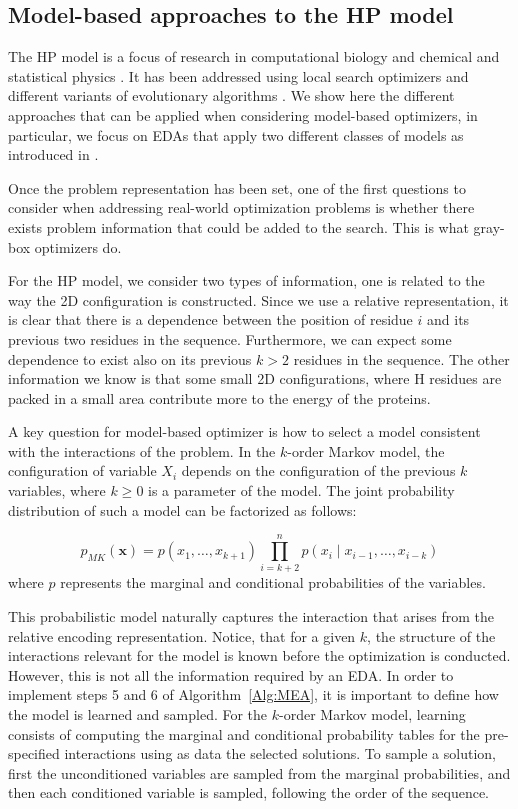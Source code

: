  \subsection{Model-based approaches to the HP model}

  The HP model is a focus of research in computational biology  \cite{Gupta_et_al:2005} and  chemical and statistical physics \cite{Kou_et_al:2006,Abe_and_Wako:2006}. It has been addressed using local search optimizers  \cite{Hsu_et_al:2003a} and different variants of evolutionary algorithms  \cite{Unger_and_Moult:1993}. We show here the different approaches that can be applied when considering model-based optimizers, in particular, we focus on EDAs that apply two different classes of models as introduced in \cite{Santana_et_al:2008a}. 

 Once the problem representation has been set, one of the first questions to consider when addressing real-world optimization problems is whether there exists problem information that could be added to the search. This is what gray-box optimizers do.

 For the HP model, we consider two types of information, one is related to the way the 2D configuration is constructed. Since we use a relative representation, it is clear that there is a dependence between the position of residue $i$ and its previous two residues in the sequence. Furthermore, we can expect some  dependence to exist also on its previous $k>2$ residues in the sequence. The other information we know is that some small 2D configurations, where H residues are packed in a small area  contribute more to the energy of the proteins.

 A key question for model-based optimizer is  how to select a model consistent with the interactions of the problem. In the $k$-order Markov model,  the configuration of variable $X_i$ depends on the configuration of the previous $k$ variables, where $k \geq 0$ is a parameter  of the model.  The joint probability distribution of such a model can be factorized as follows:

\begin{equation}
 p_{MK}(\textbf{x}) =  p(x_{1}, \ldots, x_{k+1})  \prod_{i=k+2}^{n}  p( x_{i} \mid  {x_{i-1}, \ldots, x_{i-k}})
\end{equation}
where $p$ represents the marginal and conditional probabilities of the variables. 

This probabilistic model naturally captures the interaction that arises from the relative encoding representation. Notice, that for a given $k$, the structure of the interactions relevant for the model is known before the optimization is conducted.  However, this is not all the information required by an EDA. In order to implement steps 5 and 6 of Algorithm~\ref{Alg:MEA}, it is important to define how the model is learned and sampled. For the  $k$-order Markov model, learning consists of computing the marginal and conditional probability tables for the pre-specified interactions using as data the selected solutions.  To sample a solution, first the unconditioned variables are sampled from the marginal probabilities, and then each conditioned variable is sampled, following the order of the sequence. 


